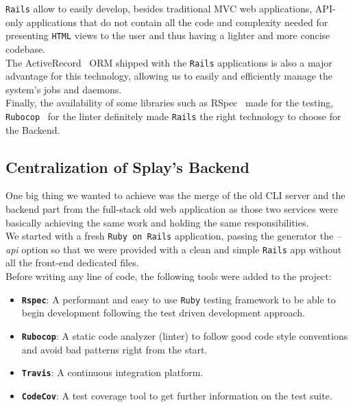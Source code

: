 \documentclass{eplmastersthesis}
\begin{document}
        \texttt{Rails} allow to easily develop, besides traditional MVC web
        applications, API-only applications that do not contain all the code
        and complexity needed for presenting \texttt{HTML} views to the user and thus
        having a lighter and more concise codebase.\\

        The ActiveRecord~\cite{activerecord} ORM shipped with the \texttt{Rails}
        applications is also a major advantage for this technology, allowing us
        to easily and efficiently manage the system's jobs and daemons.\\
        Finally, the availability of some libraries such as RSpec~\cite{rspec}
        made for the testing, \texttt{Rubocop}~\cite{Rubocop} for the linter definitely
        made \texttt{Rails} the right technology to choose for the Backend.

      \subsection{Centralization of Splay's Backend}

        One big thing we wanted to achieve was the merge of the old CLI
        server and the backend part from the full-stack old web application
        as those two services were basically achieving the same work and
        holding the same responsibilities.\\

        We started with a fresh \texttt{Ruby on Rails} application, passing the
        generator the \textit{--api} option so that we were provided with
        a clean and simple \texttt{Rails} app without all the front-end dedicated
        files.\\

        Before writing any line of code, the following tools were added
        to the project:

        \begin{itemize}
          \item \textbf{\texttt{Rspec}}: A performant and easy to use \texttt{Ruby} testing
          framework to be able to begin development following the test
          driven development approach.
          \item \textbf{\texttt{Rubocop}}: A static code analyzer (linter) to follow
          good code style conventions and avoid bad patterns right from the start.
          \item \textbf{\texttt{Travis}}: A continuous integration platform.
          \item \textbf{\texttt{CodeCov}}: A test coverage tool to get further
          information on the test suite.
        \end{itemize}
\end{document}
